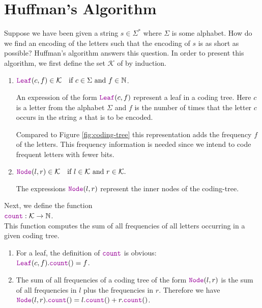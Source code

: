 \section{Huffman's Algorithm}
Suppose we have been given a string $s \in \Sigma^*$ where $\Sigma$ is some alphabet.  How do we find an encoding of the letters such 
that the encoding of $s$ is as short as possible?  Huffman's algorithm answers this question.  In order 
to present this algorithm, we first define the set $\mathcal{K}$ of  by induction.
\begin{enumerate}
\item $\mytt{Leaf}(c,f) \in \mathcal{K} \quad \mbox{if $c \in \Sigma$ and $f \in \N$}$.

      An expression of the form $\mytt{Leaf}(c,f)$ represent a leaf in a coding tree.  Here  $c$ is a letter
      from the alphabet $\Sigma$ and $f$ is the number of times that the letter $c$ occurs in the string $s$
      that is to be encoded.

      Compared to Figure \ref{fig:coding-tree} this representation adds the frequency $f$ of the letters.
      This frequency information is needed since we intend to code frequent letters with fewer bits.
\item $\mytt{Node}(l,r) \in \mathcal{K} \quad \mbox{if $l \in\mathcal{K}$ and $r \in \mathcal{K}$.}$ 

      The expressions $\mytt{Node}(l,r)$ represent the inner nodes of the coding-tree.
\end{enumerate}
Next, we define the function
\\[0.2cm]
\hspace*{1.3cm}
$\mytt{count} : \mathcal{K} \rightarrow \N$.
\\[0.2cm] 
This function computes the sum of all frequencies of all letters occurring in a given coding tree.
\begin{enumerate}
\item For a leaf, the definition of $\mytt{count}$ is obvious:
      \\[0.2cm]
      \hspace*{1.3cm}
      $\mytt{Leaf}(c,f).\mytt{count}() = f$.
\item The sum of all frequencies of a coding tree of the form $\mytt{Node}(l,r)$ is the sum of all frequencies
      in $l$ plus the frequencies in $r$.  Therefore we have
      \\[0.2cm]
      \hspace*{1.3cm}
      $\mytt{Node}(l,r).\mytt{count}() = l.\mytt{count}() + r.\mytt{count}()$. 
\end{enumerate}
